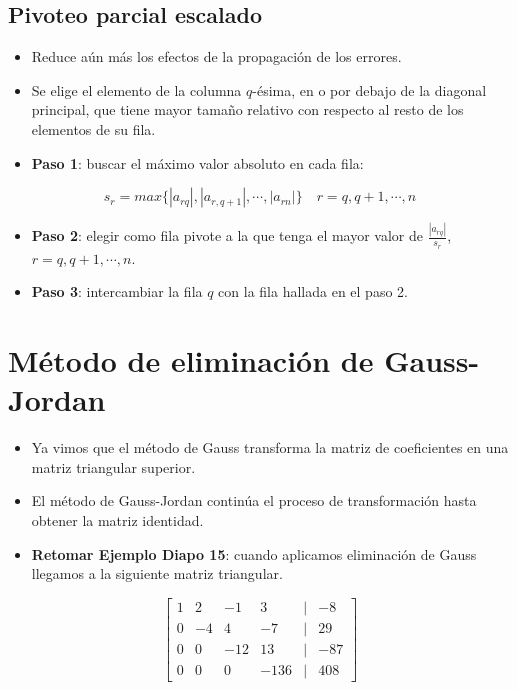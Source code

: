 \documentclass[]{book}
\providecommand{\tightlist}{%
  \setlength{\itemsep}{0pt}\setlength{\parskip}{0pt}}
\begin{document}
\hypertarget{pivoteo-parcial-escalado}{%
\subsection{Pivoteo parcial escalado}\label{pivoteo-parcial-escalado}}

\begin{itemize}
\tightlist
\item
  Reduce aún más los efectos de la propagación de los errores.
\item
  Se elige el elemento de la columna \(q\)-ésima, en o por debajo de la diagonal principal, que tiene mayor tamaño relativo con respecto al resto de los elementos de su fila.
\item
  \textbf{Paso 1}: buscar el máximo valor absoluto en cada fila:
\end{itemize}

\[
s_r = max\{|a_{rq}|, |a_{r,q+1}|, \cdots, |a_{rn}| \} \quad r = q, q+1, \cdots, n
\]

\begin{itemize}
\tightlist
\item
  \textbf{Paso 2}: elegir como fila pivote a la que tenga el mayor valor de \(\frac{|a_{rq}|}{s_r}\), \(r = q, q+1, \cdots, n\).
\item
  \textbf{Paso 3}: intercambiar la fila \(q\) con la fila hallada en el paso 2.
\end{itemize}

\hypertarget{muxe9todo-de-eliminaciuxf3n-de-gauss-jordan}{%
\section{Método de eliminación de Gauss-Jordan}\label{muxe9todo-de-eliminaciuxf3n-de-gauss-jordan}}

\begin{itemize}
\tightlist
\item
  Ya vimos que el método de Gauss transforma la matriz de coeficientes en una matriz triangular superior.
\item
  El método de Gauss-Jordan continúa el proceso de transformación hasta obtener la matriz identidad.
\item
  \textbf{Retomar Ejemplo Diapo 15}: cuando aplicamos eliminación de Gauss llegamos a la siguiente matriz triangular.
\end{itemize}

\[
\begin{bmatrix}
1 & 2 & -1 & 3 &|& -8\\
0 & -4 & 4 & -7 &|& 29\\
0 & 0 & -12 & 13 &|& -87\\
0 & 0 & 0 & -136 &|& 408  
\end{bmatrix}
\]
\end{document}
